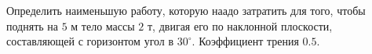 Определить наименьшую работу, которую наадо затратить для того, чтобы
поднять на $5$ м тело массы $2$ т, двигая его по наклонной плоскости,
составляющей с горизонтом угол в $30^\circ$. Коэффициент трения $0.5$.
